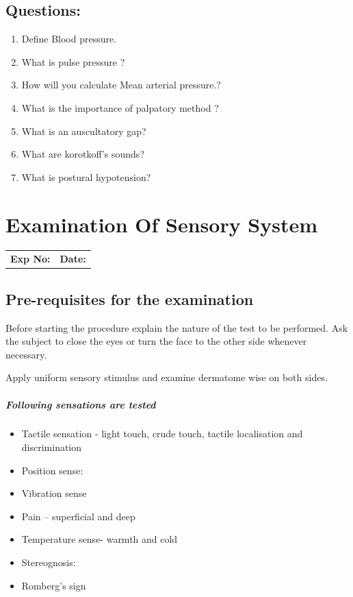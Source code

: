\documentclass[a4paper,12pt]{book}
\begin{document}
\section*{Questions:}
\begin{enumerate}
\item{Define Blood pressure.}
\item{What is pulse pressure ?}
\item{How will you calculate Mean arterial pressure.?}
\item{What is the importance of palpatory method ?}
\item{What is an auscultatory gap?}
\item{What are korotkoff’s sounds?}
\item{What is postural hypotension?}
\end{enumerate}

															\chapter*{\centering Examination Of Sensory System}
															\begin{tabular}{p{5in} p{1in}}
																\textbf{Exp No:}  & \textbf{Date:}\\
															\end{tabular}
															\section*{Pre-requisites for the examination}
															\par									Before starting the procedure explain the nature of the test to be performed. Ask the subject to close the eyes or turn the face to the other side whenever necessary.
															\par
Apply uniform sensory stimulus and examine dermatome wise on both sides.
\paragraph{Following sensations are tested}
\begin{itemize}
\item{Tactile sensation - light touch, crude touch, tactile localisation and 	discrimination}
\item{Position sense:}
\item{Vibration sense}
\item{Pain – superficial and deep}
\item{Temperature sense- warmth and cold}
\item{Stereognosis:}
\item{Romberg’s sign}
\end{itemize}
\end{document}
